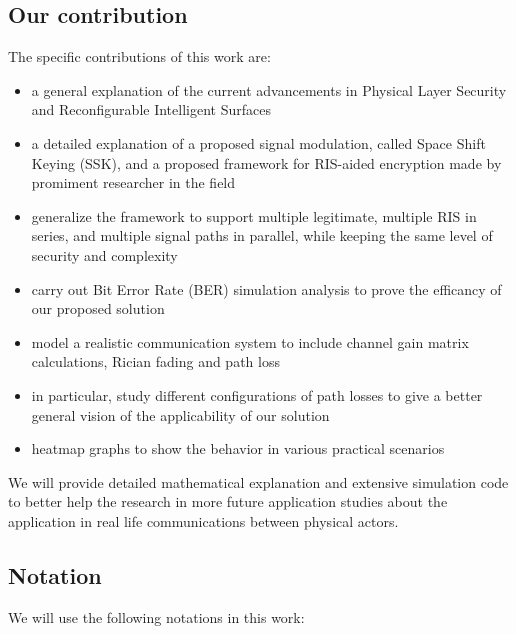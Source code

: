 \subsection{Our contribution}

The specific contributions of this work are:
\begin{itemize}
  \item a general explanation of the current advancements in Physical Layer Security and Reconfigurable Intelligent Surfaces
  \item a detailed explanation of a proposed signal modulation, called Space Shift Keying (SSK), and a proposed framework for RIS-aided encryption made by promiment researcher in the field
  \item generalize the framework to support multiple legitimate, multiple RIS in series, and multiple signal paths in parallel, while keeping the same level of security and complexity
  \item carry out Bit Error Rate (BER) simulation analysis to prove the efficancy of our proposed solution
  \item model a realistic communication system to include channel gain matrix calculations, Rician fading and path loss
  \item in particular, study different configurations of path losses to give a better general vision of the applicability of our solution
  \item heatmap graphs to show the behavior in various practical scenarios
\end{itemize}

We will provide detailed mathematical explanation and extensive simulation code to better help the research in more future application studies about the application in real life communications between physical actors.

\subsection{Notation}

We will use the following notations in this work:


